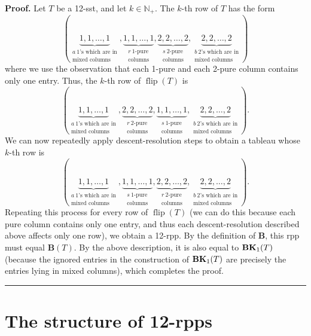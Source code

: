 \documentclass[numbers=enddot,12pt,final,onecolumn,notitlepage]{scrartcl}%
\theoremstyle{definition}
\newenvironment{proof}[1][Proof]{\noindent\textbf{#1.} }{\ \rule{0.5em}{0.5em}}
\begin{document}
\begin{proof}
Let $T$ be a 12-sst, and let $k \in \mathbb{N}_+$. The $k$-th row of $T$ has the form
\[
\left(  \underbrace{1,1,\ldots,1}_{\substack{a \ 1\text{'s
which are in}\\\text{mixed columns}}%
},\underbrace{1,1,\ldots,1}_{\substack{r \ 1\text{-pure}%
\\\text{columns}}%
},\underbrace{2,2,\ldots,2}_{\substack{s \ 2\text{-pure}%
\\\text{columns}}%
},\underbrace{2,2,\ldots,2}_{\substack{b \ 2\text{'s
which are in}\\\text{mixed columns}}}\right)
\]
where we use the observation that each 1-pure and each 2-pure column contains only one entry. Thus, the $k$-th row of $\operatorname*{flip}\left(  T\right)$ is
\[
\left(  \underbrace{1,1,\ldots,1}_{\substack{a \ 1\text{'s
which are in}\\\text{mixed columns}}%
},\underbrace{2,2,\ldots,2}_{\substack{r \ 2\text{-pure}%
\\\text{columns}}%
},\underbrace{1,1,\ldots,1}_{\substack{s \ 1\text{-pure}%
\\\text{columns}}%
},\underbrace{2,2,\ldots,2}_{\substack{b \ 2\text{'s
which are in}\\\text{mixed columns}}}\right).
\]
We can now repeatedly apply descent-resolution steps to obtain a tableau whose $k$-th row is
\[
\left(  \underbrace{1,1,\ldots,1}_{\substack{a \ 1\text{'s
which are in}\\\text{mixed columns}}%
},\underbrace{1,1,\ldots,1}_{\substack{s \ 1\text{-pure}%
\\\text{columns}}%
},\underbrace{2,2,\ldots,2}_{\substack{r \ 2\text{-pure}%
\\\text{columns}}%
},\underbrace{2,2,\ldots,2}_{\substack{b \ 2\text{'s
which are in}\\\text{mixed columns}}}\right).
\]
Repeating this process for every row of $\operatorname*{flip}\left(  T\right)$ (we can do this because each pure column contains only one entry, and thus each descent-resolution described above affects only one row), we obtain a 12-rpp. By the definition of $\mathbf{B}$, this rpp must equal $\mathbf{B}(T)$. By the above description, it is also equal to ${\mathbf{BK}}_1(T)$ (because the ignored entries in the construction of ${\mathbf{BK}}_1(T)$ are precisely the entries lying in mixed columns), which completes the proof.
\end{proof}



\section{The structure of 12-rpps}
\label{sect.structure}
\end{document}
